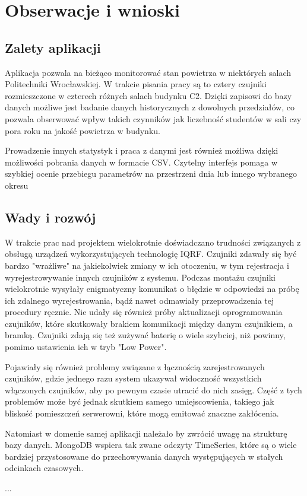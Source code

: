 \section{Obserwacje i wnioski}

\subsection{Zalety aplikacji}

Aplikacja pozwala na bieżąco monitorować stan powietrza w niektórych salach Politechniki Wrocławskiej. W trakcie pisania pracy są to
cztery czujniki rozmieszczone w czterech różnych salach budynku C2. Dzięki zapisowi do bazy danych możliwe jest badanie danych historycznych z dowolnych
przedziałów, co pozwala obserwować wpływ takich czynników jak liczebność studentów w sali czy pora roku na jakość powietrza w budynku.

Prowadzenie innych statystyk i praca z danymi jest również możliwa dzięki możliwości pobrania danych w formacie CSV. Czytelny interfejs pomaga w 
szybkiej ocenie przebiegu parametrów na przestrzeni dnia lub innego wybranego okresu

\subsection{Wady i rozwój}

W trakcie prac nad projektem wielokrotnie doświadczano trudności związanych z obsługą urządzeń wykorzystujących technologię IQRF. Czujniki zdawały się
być bardzo "wrażliwe" na jakiekolwiek zmiany w ich otoczeniu, w tym rejestracja i wyrejestrowywanie innych czujników z systemu. Podczas montażu
czujniki wielokrotnie wysyłały enigmatyczny komunikat o błędzie w odpowiedzi na próbę ich zdalnego wyrejestrowania, bądź nawet odmawiały
przeprowadzenia tej procedury ręcznie. 
Nie udały się również próby aktualizacji oprogramowania czujników, które skutkowały brakiem komunikacji między danym czujnikiem, a bramką. 
Czujniki zdają się też zużywać baterię o wiele szybciej, niż powinny, pomimo ustawienia ich w tryb "Low Power".

Pojawiały się również problemy związane z łącznością zarejestrowanych czujników, gdzie jednego razu system ukazywał widoczność wszystkich włączonych
czujników, aby po pewnym czasie utracić do nich zasięg. Część z tych problemów może być jednak skutkiem samego umiejscowienia, takiego jak bliskość 
pomieszczeń serwerowni, które mogą emitować znaczne zakłócenia.

Natomiast w domenie samej aplikacji należało by zwrócić uwagę na strukturę bazy danych. MongoDB wspiera tak zwane odczyty TimeSeries, które są o wiele
bardziej przystosowane do przechowywania danych występujących w stałych odcinkach czasowych.

...